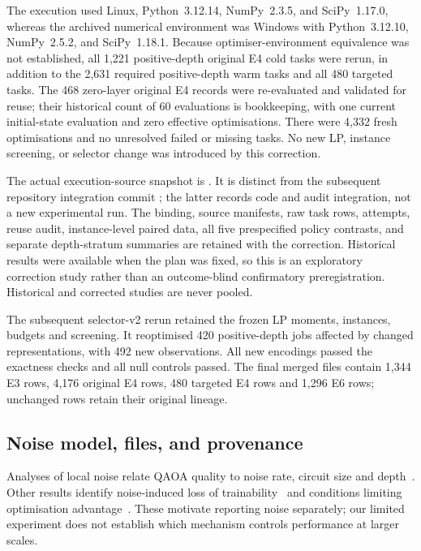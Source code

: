\documentclass[a4paper,onecolumn,11pt,unpublished]{quantumarticle}
\theoremstyle{remark}
\begin{document}
The execution used Linux, Python~3.12.14, NumPy~2.3.5, and SciPy~1.17.0,
whereas the archived numerical environment was Windows with Python~3.12.10,
NumPy~2.5.2, and SciPy~1.18.1. Because optimiser-environment equivalence
was not established, all 1,221 positive-depth original E4 cold tasks were
rerun, in addition to the 2,631 required positive-depth warm tasks and
all 480 targeted tasks. The 468 zero-layer original E4 records were
re-evaluated and validated for reuse; their historical count of 60 evaluations
is bookkeeping, with one current initial-state evaluation and zero effective
optimisations. There were 4,332 fresh optimisations and no unresolved
failed or missing tasks. No new LP, instance screening, or selector change
was introduced by this correction.

The actual execution-source snapshot is
\texttt{}.
It is distinct from the subsequent repository integration commit
\texttt{};
the latter records code and audit integration, not a new experimental run.
The binding, source manifests, raw task rows, attempts, reuse audit,
instance-level paired data, all five prespecified policy contrasts, and
separate depth-stratum summaries are retained with the correction.
Historical results were available when the plan was fixed, so this is an
exploratory correction study rather than an outcome-blind confirmatory
preregistration. Historical and corrected studies are never pooled.

The subsequent selector-v2 rerun retained the frozen LP moments, instances,
budgets and screening. It reoptimised 420 positive-depth jobs affected by
changed representations, with 492 new observations. All new encodings passed
the exactness checks and all null controls passed. The final merged files contain
1,344 E3 rows, 4,176 original E4 rows, 480 targeted E4 rows and 1,296 E6 rows;
unchanged rows retain their original lineage.


\subsection{Noise model, files, and provenance}
Analyses of local noise relate QAOA quality to noise rate, circuit size
and depth~\cite{Marshall2020}. Other results identify noise-induced
loss of trainability~\cite{WangNoise2021} and conditions limiting
optimisation advantage~\cite{Franca2021}. These motivate reporting
noise separately; our limited experiment does not establish which
mechanism controls performance at larger scales.
\end{document}

